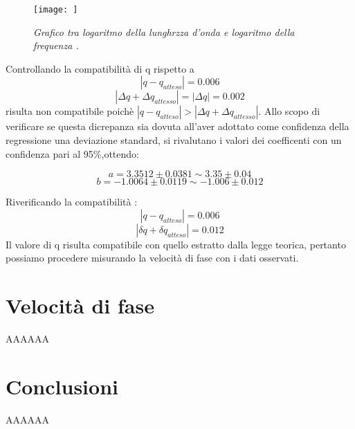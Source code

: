 \documentclass[12pt, a4paper]{article}
\begin{document}
\begin{figure}[!htb]
\centering
\texttt{[image: ]}
    \centering
    \caption{\textit{Grafico tra logaritmo della lunghrzza d'onda e logaritmo della frequenza .}}
\end{figure}


Controllando la compatibilità di q rispetto a
\begin{equation*}
    |q-q_{atteso}| = 0.006 
\end{equation*} 
\begin{equation*}
     |\Delta q + \Delta q_{attesso}| = |\Delta q | = 0.002
\end{equation*}
risulta non compatibile poichè $|q-q_{atteso}|>|\Delta q + \Delta q_{attesso}|$.
Allo scopo di verificare se questa dicrepanza sia dovuta all'aver adottato come confidenza della regressione una deviazione standard, si rivalutano i valori dei coefficenti con un confidenza pari al 95$\%$,ottendo:

\begin{equation*}
    a = 3.3512 \pm 0.0381  \sim 3.35 \pm 0.04 
\end{equation*}
\begin{equation*}
    b = -1.0064 \pm 0.0119 \sim -1.006 \pm 0.012 
\end{equation*}
\bigskip

Riverificando la compatibilità : 
\begin{equation*}
    |q-q_{atteso}| = 0.006
\end{equation*}
\begin{equation*}
    |\delta q + \delta q_{atteso}| = 0.012 
\end{equation*}
Il valore di q risulta compatibile con quello estratto dalla legge teorica, pertanto possiamo procedere misurando la velocità di fase con i dati osservati.





\section{Velocità di fase}
AAAAAA

\section{Conclusioni}
AAAAAA

\newpage
\end{document}

